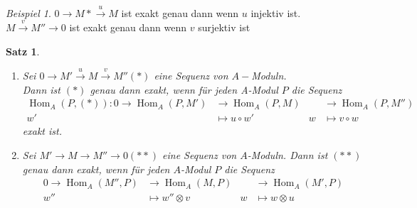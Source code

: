 \documentclass[10pt,a4paper]{article}
\newcommand{\Hom}{\operatorname{Hom}}
\newcounter{thm}[section]
\theoremstyle{definition}
\theoremstyle{plain}
\newtheorem{satz}[thm]{Satz}
\theoremstyle{remark}
\newtheorem*{exm*}{Beispiel}
\begin{document}
\begin{exm*}
	$0\rightarrow M*\xrightarrow{u}M$ ist exakt genau dann wenn $u$ injektiv ist.\\
	$M\xrightarrow{v}M''\rightarrow 0$ ist exakt genau dann wenn $v$ surjektiv ist
\end{exm*}
\begin{satz}
	\begin{enumerate}
		\item Sei $0\rightarrow M'\xrightarrow{u}M\xrightarrow{v}M''(*)$ eine Sequenz von $A-$Moduln.\\
		Dann ist $(*)$ genau dann exakt, wenn für jeden A-Modul $P$ die Sequenz
		\begin{align*}
		\Hom_A(P,(*)):0\rightarrow \Hom_A(P,M')&\rightarrow \Hom_A(P,M)&&\rightarrow \Hom_A(P,M'')\\
		w'&\mapsto u\circ w'&w&\mapsto v\circ w
		\end{align*}
		exakt ist.
		\item Sei $M'\to M\to M''\to 0 (**)$ eine Sequenz von $A$-Moduln. Dann ist $(**)$ genau dann exakt, wenn für jeden $A$-Modul $P$ die Sequenz
		\begin{align*}
		0\to\Hom_A(M'',P)&\to\Hom_A(M,P)&&\to\Hom_A(M',P)\\
		w''&\mapsto w''\otimes v&w&\mapsto w\otimes u
		\end{align*}
	\end{enumerate}
\end{satz}
\end{document}

